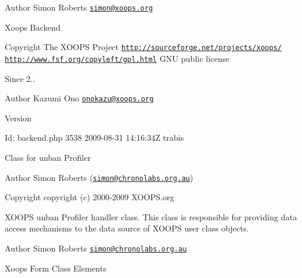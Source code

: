 \begin{DoxyAuthor}{Author}
Simon Roberts \href{mailto:simon@xoops.org}{\tt simon@xoops.\-org}
\end{DoxyAuthor}
Xoops Backend

\begin{DoxyCopyright}{Copyright}
The X\-O\-O\-P\-S Project \href{http://sourceforge.net/projects/xoops/}{\tt http\-://sourceforge.\-net/projects/xoops/}  \href{http://www.fsf.org/copyleft/gpl.html}{\tt http\-://www.\-fsf.\-org/copyleft/gpl.\-html} G\-N\-U public license
\end{DoxyCopyright}
\begin{DoxySince}{Since}
2.. 
\end{DoxySince}
\begin{DoxyAuthor}{Author}
Kazumi Ono \href{mailto:onokazu@xoops.org}{\tt onokazu@xoops.\-org} 
\end{DoxyAuthor}
\begin{DoxyVersion}{Version}

\end{DoxyVersion}
\begin{DoxyParagraph}{Id\-:}
backend.\-php 3538 2009-\/08-\/31 14\-:16\-:34\-Z trabis 
\end{DoxyParagraph}


Class for unban Profiler \begin{DoxyAuthor}{Author}
Simon Roberts (\href{mailto:simon@chronolabs.org.au}{\tt simon@chronolabs.\-org.\-au}) 
\end{DoxyAuthor}
\begin{DoxyCopyright}{Copyright}
copyright (c) 2000-\/2009 X\-O\-O\-P\-S.\-org
\end{DoxyCopyright}
X\-O\-O\-P\-S unban Profiler handler class. This class is responsible for providing data access mechanisms to the data source of X\-O\-O\-P\-S user class objects.

\begin{DoxyAuthor}{Author}
Simon Roberts \href{mailto:simon@chronolabs.org.au}{\tt simon@chronolabs.\-org.\-au}
\end{DoxyAuthor}
Xoops Form Class Elements

